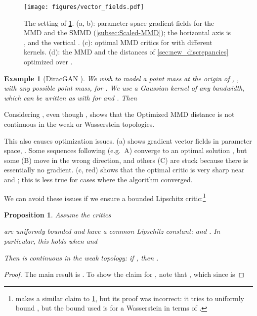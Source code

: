 \documentclass{article}
\let\citep\parencite
\newtheorem{prop}[lem]{Proposition}
\newtheorem{example}{Example}
\begin{document}
\begin{figure}[t]
\centering
        \texttt{[image: figures/vector\_fields.pdf]}
        \caption{The setting of \cref{example:diracgan}.
(a, b): parameter-space gradient fields for the MMD and the SMMD (\cref{subsec:Scaled-MMD}); the horizontal axis is , and the vertical .
         (c): optimal MMD critics for  with different kernels.
         (d): the MMD and the distances of \cref{sec:new_discrepancies} optimized over .}
       \label{fig:mmd_vector_fields}
\end{figure}
\begin{example}[DiracGAN \citep{Mescheder:2018}] \label{example:diracgan}
We wish to model a point mass at the origin of ,
,
with any possible point mass,  for .
We use a Gaussian kernel of any bandwidth,
which can be written as 
with  for 
and
.
Then

\end{example}
Considering ,
even though ,
shows that the Optimized MMD
distance is not continuous in the weak or Wasserstein topologies.

This also causes optimization issues.
 (a) shows gradient vector fields in parameter space,
.
Some sequences following  (e.g.\ A) converge to an optimal solution , but some (B) move in the wrong direction,
and others (C) are stuck because there is essentially no gradient.
 (c, red) shows that the optimal  critic is very sharp near  and ;
this is less true for cases where the algorithm converged.


We can avoid these issues if we ensure a bounded Lipschitz critic:\footnote{\cite[Theorem 4]{mmd-gan} makes a similar claim to \cref{prop:optmmd:weakness}, but its proof was incorrect: it tries to uniformly bound , but the bound used is for a Wasserstein in terms of .}
\begin{prop} \label{prop:optmmd:weakness}
  Assume the critics
  
  are uniformly bounded and have a common Lipschitz constant:
   and
  .
In particular, this holds when  and

Then  is continuous in the weak topology:
  if , then .
\end{prop}
\begin{proof}
  The main result is \cite[Corollary 11.3.4]{dudley:analysis}.
To show the claim for , note that
  ,
  which since  is

\end{proof}
\end{document}
